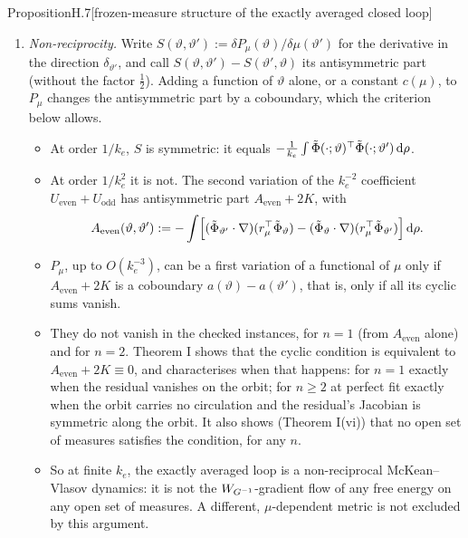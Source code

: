 \begin{thm}{Proposition}{H.7}[frozen-measure structure of the exactly averaged closed loop]
\begin{enumerate}[label=(\alph*)]
  \item \emph{Non-reciprocity.} Write $S(\vartheta,\vartheta') := \delta P_\mu(\vartheta)/\delta\mu(\vartheta')$ for
    the derivative in the direction $\delta_{\vartheta'}$, and call $S(\vartheta,\vartheta') - S(\vartheta',\vartheta)$
    its antisymmetric part (without the factor $\frac12$). Adding a function of $\vartheta$ alone, or a constant
    $c(\mu)$, to $P_\mu$ changes the antisymmetric part by a coboundary, which the criterion below allows.
    \begin{itemize}
      \item At order $1/k_e$, $S$ is symmetric: it equals
        $-\frac{1}{k_e}\int\tilde\Phi(\cdot;\vartheta)^\top\tilde\Phi(\cdot;\vartheta')\,\mathrm{d}\rho$.
      \item At order $1/k_e^2$ it is not. The second variation of the $k_e^{-2}$ coefficient
        $U_{\mathrm{even}}+U_{\mathrm{odd}}$ has antisymmetric part $A_{\mathrm{even}}+2K$, with
        \begin{equation}\label{eq:finitegain:Aeven}
          A_{\mathrm{even}}(\vartheta,\vartheta') := -\int\Bigl[(\tilde\Phi_{\vartheta'}\cdot\nabla)
            (r_\mu^\top\tilde\Phi_\vartheta) - (\tilde\Phi_\vartheta\cdot\nabla)(r_\mu^\top\tilde\Phi_{\vartheta'})\Bigr]
            \,\mathrm{d}\rho .
        \end{equation}
      \item $P_\mu$, up to $O(k_e^{-3})$, can be a first variation of a functional of $\mu$ only if
        $A_{\mathrm{even}}+2K$ is a coboundary $a(\vartheta)-a(\vartheta')$, that is, only if all its cyclic sums
        vanish.
      \item They do not vanish in the checked instances, for $n=1$ (from $A_{\mathrm{even}}$ alone) and for $n=2$.
        Theorem I shows that the cyclic condition is equivalent to $A_{\mathrm{even}}+2K\equiv0$, and characterises
        when that happens: for $n=1$ exactly when the residual vanishes on the orbit; for $n\ge2$ at perfect fit
        exactly when the orbit carries no circulation and the residual's Jacobian is symmetric along the orbit. It
        also shows (Theorem I(vi)) that no open set of measures satisfies the condition, for any $n$.
      \item So at finite $k_e$, the exactly averaged loop is a non-reciprocal McKean--Vlasov dynamics: it is not the
        $W_{G^{-1}}$-gradient flow of any free energy on any open set of measures. A different, $\mu$-dependent metric is
        not excluded by this argument.
    \end{itemize}
\end{enumerate}
\end{thm}

